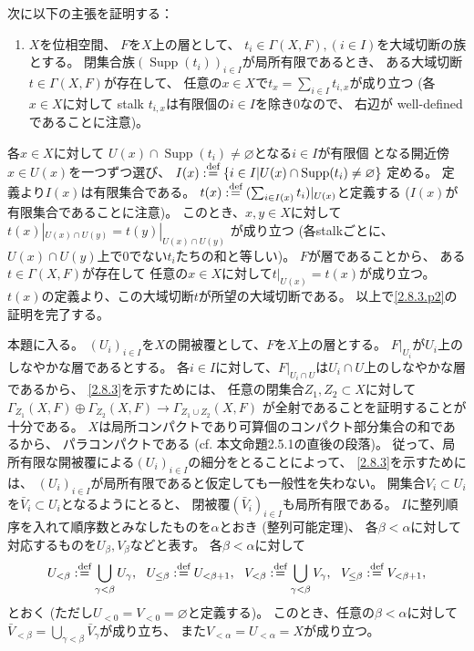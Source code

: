 \documentclass[uplatex,dvipdfmx]{jsarticle}
\makeatletter
\theoremstyle{definition}
\renewenvironment{proof}[1][\proofname]{
  \pushQED{\qed}%
  \normalfont \topsep6\p@\@plus6\p@\relax
  \trivlist
  \item[\hskip\labelsep
    #1\@addpunct{\textbf{.}}]\ignorespaces
}{%
  \popQED\endtrivlist\@endpefalse
}
\providecommand{\proofname}{証明}
\DeclareMathOperator{\Supp}{\mathrm{Supp}}
\renewcommand{\emptyset}{\varnothing}
\def\dfn{:\overset{\mbox{{\scriptsize def}}}{=}}
\makeatother
\begin{document}
\begin{proof}
  次に以下の主張を証明する：
  \begin{enumerate}[label=(\fnsymbol*),start=3]
    \item \label{2.8.3.p2}
    \(X\)を位相空間、
    \(F\)を\(X\)上の層として、
    \(t_i\in \Gamma(X,F), (i\in I)\)を大域切断の族とする。
    閉集合族\((\Supp(t_i))_{i\in I}\)が局所有限であるとき、
    ある大域切断\(t\in \Gamma(X,F)\)が存在して、
    任意の\(x\in X\)で\(t_x = \sum_{i\in I}t_{i,x}\)が成り立つ
    (各\(x\in X\)に対して
    stalk \(t_{i,x}\)は有限個の\(i\in I\)を除き\(0\)なので、
    右辺が well-defined であることに注意)。
  \end{enumerate}
  各\(x\in X\)に対して
  \(U(x) \cap \Supp(t_i) \neq \emptyset\)となる\(i\in I\)が有限個
  となる開近傍\(x\in U(x)\)を一つずつ選び、
  \(I(x) \dfn \left\{i\in I\middle| U(x)\cap \Supp(t_i) \neq \emptyset\right\}\)
  定める。
  定義より\(I(x)\)は有限集合である。
  \(t(x)\dfn (\sum_{i\in I(x)}t_i)|_{U(x)}\)と定義する
  (\(I(x)\)が有限集合であることに注意)。
  このとき、\(x,y\in X\)に対して
  \(t(x)|_{U(x)\cap U(y)} = t(y)|_{U(x)\cap U(y)}\)
  が成り立つ
  (各stalkごとに、\(U(x)\cap U(y)\)上で\(0\)でない\(t_i\)たちの和と等しい)。
  \(F\)が層であることから、
  ある\(t\in \Gamma(X,F)\)が存在して
  任意の\(x\in X\)に対して\(t|_{U(x)} = t(x)\)が成り立つ。
  \(t(x)\)の定義より、この大域切断\(t\)が所望の大域切断である。
  以上で\ref{2.8.3.p2}の証明を完了する。

  本題に入る。
  \((U_i)_{i\in I}\)を\(X\)の開被覆として、\(F\)を\(X\)上の層とする。
  \(F|_{U_i}\)が\(U_i\)上のしなやかな層であるとする。
  各\(i\in I\)に対して、\(F|_{U_i\cap U}\)は\(U_i\cap U\)上のしなやかな層であるから、
  \ref{2.8.3}を示すためには、
  任意の閉集合\(Z_1,Z_2\subset X\)に対して
  \(\Gamma_{Z_1}(X,F) \oplus \Gamma_{Z_2}(X,F)\to \Gamma_{Z_1\cup Z_2}(X,F)\)
  が全射であることを証明することが十分である。
  \(X\)は局所コンパクトであり可算個のコンパクト部分集合の和であるから、
  パラコンパクトである (cf. 本文命題2.5.1の直後の段落)。
  従って、局所有限な開被覆による\((U_i)_{i\in I}\)の細分をとることによって、
  \ref{2.8.3}を示すためには、
  \((U_i)_{i\in I}\)が局所有限であると仮定しても一般性を失わない。
  開集合\(V_i\subset U_i\)を\(\bar{V}_i\subset U_i\)となるようにとると、
  閉被覆\((\bar{V}_i)_{i\in I}\)も局所有限である。
  \(I\)に整列順序を入れて順序数とみなしたものを\(\alpha\)とおき (整列可能定理)、
  各\(\beta<\alpha\)に対して対応するものを\(U_{\beta},V_{\beta}\)などと表す。
  各\(\beta<\alpha\)に対して
  \[
  U_{<\beta} \dfn \bigcup_{\gamma<\beta}U_{\gamma}, \ \
  U_{\leq\beta} \dfn U_{<\beta+1}, \ \
  V_{<\beta} \dfn \bigcup_{\gamma<\beta}V_{\gamma}, \ \
  V_{\leq\beta} \dfn V_{<\beta+1},
  \]
  とおく
  (ただし\(U_{<0}=V_{<0}=\emptyset\)と定義する)。
  このとき、任意の\(\beta<\alpha\)に対して
  \(\bar{V}_{<\beta} = \bigcup_{\gamma<\beta}\bar{V}_{\gamma}\)が成り立ち、
  また\(V_{<\alpha} = U_{<\alpha} = X\)が成り立つ。


\end{proof}
\end{document}
